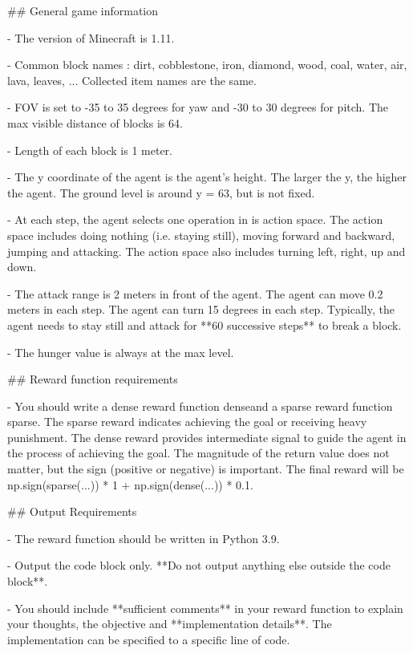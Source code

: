 \#\# General game information

- The version of Minecraft is 1.11.

- Common block names : dirt, cobblestone, iron, diamond, wood, coal, water, air, lava, leaves, ... Collected item names are the same.

- FOV is set to -35 to 35 degrees for yaw and -30 to 30 degrees for pitch. The max visible distance of blocks is 64.

- Length of each block is 1 meter.

- The y coordinate of the agent is the agent's height. The larger the y, the higher the agent. The ground level is around y = 63, but is not fixed.

- At each step, the agent selects one operation in is action space. The action space includes doing nothing (i.e. staying still), moving forward and backward, jumping and attacking. The action space also includes turning left, right, up and down. 

- The attack range is 2 meters in front of the agent. The agent can move 0.2 meters in each step. The agent can turn 15 degrees in each step. Typically, the agent needs to stay still and attack for **60 successive steps** to break a block.

- The hunger value is always at the max level.





\#\# Reward function requirements

- You should write a dense reward function \textasciigrave dense\textasciigrave  and a sparse reward function \textasciigrave sparse\textasciigrave . The sparse reward indicates achieving the goal or receiving heavy punishment. The dense reward provides intermediate signal to guide the agent in the process of achieving the goal. The magnitude of the return value does not matter, but the sign (positive or negative) is important. The final reward will be \textasciigrave np.sign(sparse(...)) * 1 + np.sign(dense(...)) * 0.1\textasciigrave .





\#\# Output Requirements

- The reward function should be written in Python 3.9.

- Output the code block only. **Do not output anything else outside the code block**.

- You should include **sufficient comments** in your reward function to explain your thoughts, the objective and **implementation details**. The implementation can be specified to a specific line of code.

